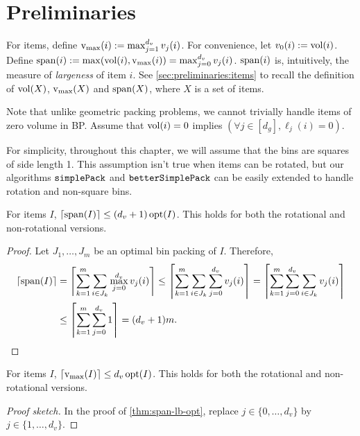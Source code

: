 \section{Preliminaries}
\label{sec:gvbp-prelims}

For  items,
define $\operatorname{v_{\max}}(i) := \max_{j=1}^{d_v} v_j(i)$.
For convenience, let $v_0(i) := \operatorname{vol}(i)$.
Define $\operatorname{span}(i) := \max(\operatorname{vol}(i), \operatorname{v_{\max}}(i)) = \max_{j=0}^{d_v} v_j(i)$.
$\operatorname{span}(i)$ is, intuitively, the measure of \emph{largeness} of item $i$.
See \cref{sec:preliminaries:items} to recall the definition of
$\operatorname{vol}(X)$, $\operatorname{v_{\max}}(X)$ and $\operatorname{span}(X)$,
where $X$ is a set of  items.

Note that unlike geometric packing problems,
we cannot trivially handle items of zero volume in  BP.
Assume \wLoG{} that $\operatorname{vol}(i) = 0$ implies $(\forall j \in [d_g], \ell_j(i) = 0)$.

For simplicity, throughout this chapter, we will assume that the bins are squares of side length 1.
This assumption isn't true when items can be rotated, but our algorithms
$\operatorname{\mathtt{simplePack}}$ and $\operatorname{\mathtt{betterSimplePack}}$ can be easily extended to handle
rotation and non-square bins.

\begin{lemma}
\label{thm:span-lb-opt}
For  items $I$, $\left\lceil \operatorname{span}(I) \right\rceil \le (d_v+1)\operatorname{opt}(I)$.
This holds for both the rotational and non-rotational versions.
\end{lemma}
\begin{proof}
Let $J_1, \ldots, J_m$ be an optimal bin packing of $I$. Therefore,
\begin{align*}
\left\lceil \operatorname{span}(I) \right\rceil &= \left\lceil \sum_{k=1}^m \sum_{i \in J_k} \max_{j=0}^{d_v} v_j(i) \right\rceil
\le \left\lceil \sum_{k=1}^m \sum_{i \in J_k} \sum_{j=0}^{d_v} v_j(i) \right\rceil
= \left\lceil \sum_{k=1}^m \sum_{j=0}^{d_v} \sum_{i \in J_k} v_j(i) \right\rceil
\\ &\le \left\lceil \sum_{k=1}^m \sum_{j=0}^{d_v} 1 \right\rceil
= (d_v+1)m.  \qedhere
\end{align*}
\end{proof}

\begin{lemma}
\label{thm:vmax-lb-opt}
For  items $I$, $\left\lceil \operatorname{v_{\max}}(I) \right\rceil \le d_v\operatorname{opt}(I)$.
This holds for both the rotational and non-rotational versions.
\end{lemma}
\begin{proof}[Proof sketch]
In the proof of \cref{thm:span-lb-opt}, replace $j \in \{0, \ldots, d_v\}$
by $j \in \{1, \ldots, d_v\}$.
\end{proof}
